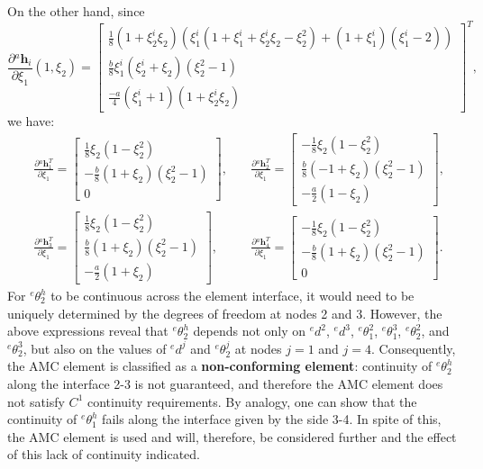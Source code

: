 \documentclass[12pt]{article}
\begin{document}
On the other hand, since
\[
    \frac{\partial {}^a\mathbf{h}_i}{\partial \xi_1}(1,\xi_2) = \begin{bmatrix}
        \frac{1}{8} (1+\xi_2^i\xi_2) \left( \xi_1^i(1+\xi_1^i+\xi_2^i\xi_2-\xi_2^2) + (1+\xi_1^i)(\xi_1^i-2) \right) \\[8pt]
        \frac{b}{8} \xi_1^i (\xi_2^i+\xi_2)(\xi_2^2-1)                                                               \\[8pt]
        \frac{-a}{4} (\xi_1^i+1)(1+\xi_2^i\xi_2)
    \end{bmatrix}^T,
\]
we have:
\begin{align*}
     & \frac{\partial {}^a\mathbf{h}_1^T}{\partial \xi_1} =
    \begin{bmatrix}
        \frac{1}{8}\xi_2(1-\xi_2^2)      \\
        -\frac{b}{8}(1+\xi_2)(\xi_2^2-1) \\
        0
    \end{bmatrix},
    \quad
     & \frac{\partial {}^a\mathbf{h}_2^T}{\partial \xi_1} =
    \begin{bmatrix}
        -\frac{1}{8}\xi_2(1-\xi_2^2)     \\
        \frac{b}{8}(-1+\xi_2)(\xi_2^2-1) \\
        -\frac{a}{2}(1-\xi_2)
    \end{bmatrix},                        \\
     & \frac{\partial {}^a\mathbf{h}_3^T}{\partial \xi_1} =
    \begin{bmatrix}
        \frac{1}{8}\xi_2(1-\xi_2^2)     \\
        \frac{b}{8}(1+\xi_2)(\xi_2^2-1) \\
        -\frac{a}{2}(1+\xi_2)
    \end{bmatrix},
     & \frac{\partial {}^a\mathbf{h}_4^T}{\partial \xi_1} =
    \begin{bmatrix}
        -\frac{1}{8}\xi_2(1-\xi_2^2)     \\
        -\frac{b}{8}(1+\xi_2)(\xi_2^2-1) \\
        0
    \end{bmatrix}.
\end{align*}
For ${}^e \theta_2^h$ to be continuous across the element interface, it would need to be uniquely determined by the degrees of freedom at nodes 2 and 3. However, the above expressions reveal that ${}^e \theta_2^h$ depends not only on ${}^e d^2$, ${}^e d^3$, ${}^e \theta_1^2$, ${}^e \theta_1^3$, ${}^e \theta_2^2$, and ${}^e \theta_2^3$, but also on the values of ${}^e d^j$ and ${}^e \theta_2^j$ at nodes $j=1$ and $j=4$. Consequently, the AMC element is classified as a \textbf{non-conforming element}: continuity of ${}^e \theta_2^h$ along the interface 2-3 is not guaranteed, and therefore the AMC element does not satisfy $C^1$ continuity requirements. By analogy, one can show that the continuity of ${}^e{\theta}_1^h$ fails along the interface given by the side 3-4. In spite of this, the AMC element is used and will, therefore, be considered further and the effect of this lack of continuity indicated.
\end{document}
